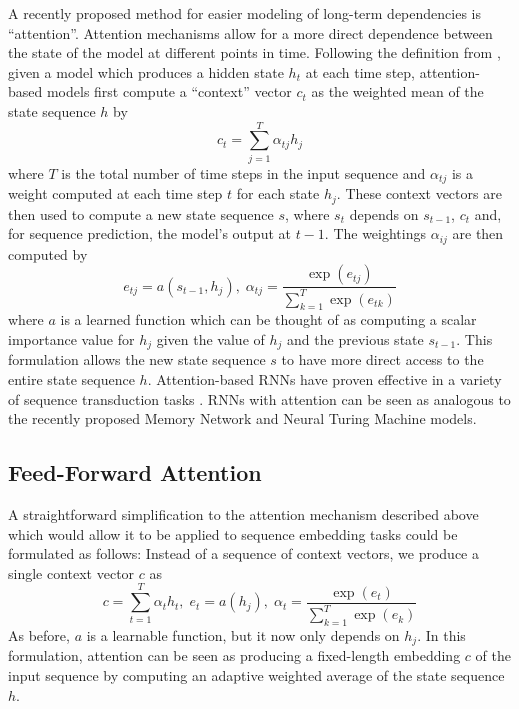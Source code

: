 \documentclass{article} %
\begin{document}
A recently proposed method for easier modeling of long-term dependencies is ``attention''.
Attention mechanisms allow for a more direct dependence between the state of the model at different points in time.
Following the definition from \cite{bahdanau2014neural}, given a model which produces a hidden state $h_t$ at each time step, attention-based models first compute a ``context'' vector $c_t$ as the weighted mean of the state sequence $h$ by
$$
c_t = \sum_{j = 1}^T \alpha_{tj} h_j
$$
where $T$ is the total number of time steps in the input sequence and $\alpha_{tj}$ is a weight computed at each time step $t$ for each state $h_j$.
These context vectors are then used to compute a new state sequence $s$, where $s_t$ depends on $s_{t - 1}$, $c_t$ and, for sequence prediction, the model's output at $t - 1$.
The weightings $\alpha_{ij}$ are then computed by
$$
e_{tj} = a(s_{t - 1}, h_j),\; \alpha_{tj} = \frac{\exp(e_{tj})}{\sum_{k = 1}^T \exp(e_{tk})}
$$
where $a$ is a learned function which can be thought of as computing a scalar importance value for $h_j$ given the value of $h_j$ and the previous state $s_{t - 1}$.
This formulation allows the new state sequence $s$ to have more direct access to the entire state sequence $h$.
Attention-based RNNs have proven effective in a variety of sequence transduction tasks \cite{bahdanau2014neural,cho2015describing}.
RNNs with attention can be seen as analogous to the recently proposed Memory Network \cite{weston2014memory,sukhbaatar2015end} and Neural Turing Machine \cite{graves2014neural} models.

\subsection{Feed-Forward Attention}

A straightforward simplification to the attention mechanism described above which would allow it to be applied to sequence embedding tasks could be formulated as follows:
Instead of a sequence of context vectors, we produce a single context vector $c$ as
\begin{equation}
\label{eq:ffattention}
c = \sum_{t = 1}^T \alpha_t h_t,\; e_t = a(h_j),\; \alpha_t = \frac{\exp(e_t)}{\sum_{k = 1}^T \exp(e_k)}
\end{equation}
As before, $a$ is a learnable function, but it now only depends on $h_j$.
In this formulation, attention can be seen as producing a fixed-length embedding $c$ of the input sequence by computing an adaptive weighted average of the state sequence $h$.
\end{document}
